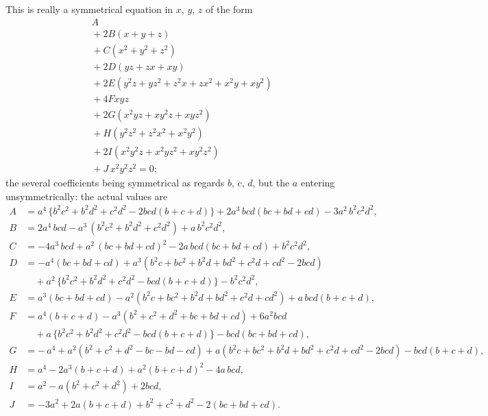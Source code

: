 \documentclass[11pt]{article}
\begin{document}
This is really a symmetrical equation in $x$, $y$, $z$ of the form
\[ \begin{aligned}
& A\\
&{}+ 2B(x + y + z)\\
&{}+ C(x^{2} + y^{2} + z^{2})\\
&{}+ 2D(yz + zx + xy)\\
&{}+ 2E(y^{2}z + yz^{2} + z^{2}x + zx^{2} + x^{2}y + xy^{2})\\
&{}+ 4Fxyz\\
&{}+ 2G(x^{2}yz + xy^{2}z + xyz^{2})\\
&{}+ H(y^{2}z^{2} + z^{2}x^{2} + x^{2}y^{2})\\
&{}+ 2I(x^{2}y^{2}z + x^{2}yz^{2} + xy^{2}z^{2})\\
&{}+ J\,x^{2}y^{2}z^{2} = 0;
\end{aligned} \]
the several coefficients being symmetrical as regards $b$, $c$, $d$, but the $a$ entering unsymmetrically: the actual values are
\begin{align*}
A &= a^{4}\,\{b^{2}c^{2} + b^{2}d^{2} + c^{2}d^{2} - 2bcd(b + c + d)\} + 2a^{3}\,bcd(bc + bd + cd) - 3a^{2}\,b^{2}c^{2}d^{2},\\
B &= 2a^{4}\,bcd - a^{3}\,(b^{2}c^{2} + b^{2}d^{2} + c^{2}d^{2}) + a\,b^{2}c^{2}d^{2},\\
C &= -4a^{3}\,bcd + a^{2}\,(bc + bd + cd)^{2} - 2a\,bcd(bc + bd + cd) + b^{2}c^{2}d^{2},\\
D &= -a^{4}(bc + bd + cd) + a^{3}(b^{2}c + bc^{2} + b^{2}d + bd^{2} + c^{2}d + cd^{2} - 2bcd)\\
&\quad + a^{2}\,\{b^{2}c^{2} + b^{2}d^{2} + c^{2}d^{2} - bcd(b + c + d)\} - b^{2}c^{2}d^{2},\\
E &= a^{3}(bc + bd + cd) - a^{2}(b^{2}c + bc^{2} + b^{2}d + bd^{2} + c^{2}d + cd^{2}) + a\,bcd(b + c + d),\\
F &= a^{4}(b + c + d) - a^{3}(b^{2} + c^{2} + d^{2} + bc + bd + cd) + 6a^{2}bcd\\
&\quad + a\,\{b^{2}c^{2} + b^{2}d^{2} + c^{2}d^{2} - bcd(b + c + d)\} - bcd(bc + bd + cd),\\
G &= -\,a^{4} + a^{2}(b^{2} + c^{2} + d^{2} - bc - bd - cd) + a(b^{2}c + bc^{2} + b^{2}d + bd^{2} + c^{2}d + cd^{2} - 2bcd) - bcd(b + c + d),\\
H &= a^{4} - 2a^{3}(b + c + d) + a^{2}(b + c + d)^{2} - 4a\,bcd,\\
I &= a^{2} - a(b^{2} + c^{2} + d^{2}) + 2bcd,\\
J &= -3a^{2} + 2a(b + c + d) + b^{2} + c^{2} + d^{2} - 2(bc + bd + cd).
\end{align*}
\end{document}
